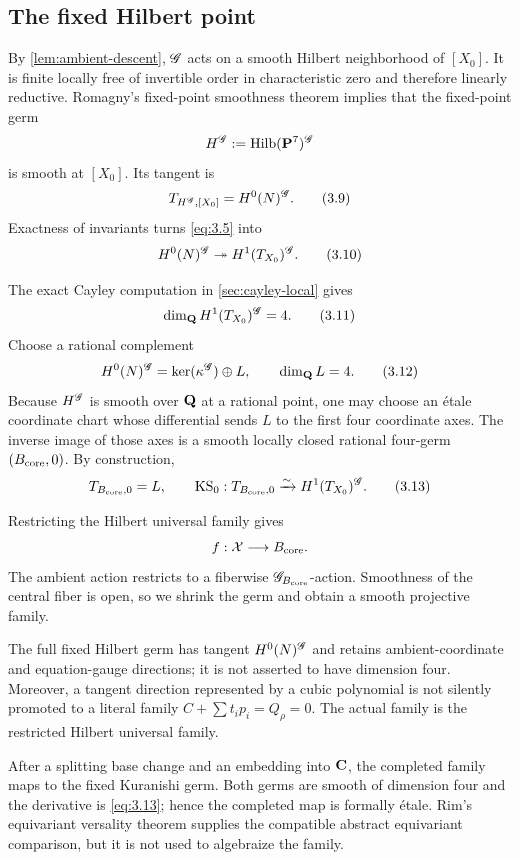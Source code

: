 \subsection{The fixed Hilbert point}

By \cref{lem:ambient-descent}, \(\mathscr G\) acts on a smooth Hilbert
neighborhood of \([X_0]\).  It is finite locally free of invertible order in
characteristic zero and therefore linearly reductive.  Romagny's fixed-point
smoothness theorem \cite[Theorems 1.2.1(2) and 4.3.6]{Romagny2022} implies
that the fixed-point germ
\[
 H^{\mathscr G}:=\operatorname{Hilb}(\mathbf P^7)^{\mathscr G}
\]
is smooth at \([X_0]\).  Its tangent is
\[
 T_{H^{\mathscr G},[X_0]}=H^0(N)^{\mathscr G}.         \tag{3.9}
\]
Exactness of invariants turns \cref{eq:3.5} into
\[
 H^0(N)^{\mathscr G}\twoheadrightarrow
 H^1(T_{X_0})^{\mathscr G}.                          \tag{3.10}
\]

The exact Cayley computation in \cref{sec:cayley-local} gives
\[
 \dim_\mathbf Q H^1(T_{X_0})^{\mathscr G}=4.                \tag{3.11}
\]
Choose a rational complement
\[
 H^0(N)^{\mathscr G}=\ker(\kappa^{\mathscr G})\oplus L,
 \qquad \dim_\mathbf Q L=4.                               \tag{3.12}
\]
Because \(H^{\mathscr G}\) is smooth over \(\mathbf Q\) at a rational point, one
may choose an \'etale coordinate chart whose differential sends \(L\) to
the first four coordinate axes.  The inverse image of those axes is a
smooth locally closed rational four-germ \((B_{\mathrm{core}},0)\).  By construction,
\[
 T_{B_{\mathrm{core}},0}=L,\qquad
 \operatorname{KS}_0:T_{B_{\mathrm{core}},0}\xrightarrow{\sim}
 H^1(T_{X_0})^{\mathscr G}.                          \tag{3.13}
\label{eq:3.13}
\]

Restricting the Hilbert universal family gives
\[
 f:\mathcal X\longrightarrow B_{\mathrm{core}}.
\]
The ambient action restricts to a fiberwise
\(\mathscr G_{B_{\mathrm{core}}}\)-action.  Smoothness of the central fiber is open, so
we shrink the germ and obtain a smooth projective family.

\begin{remark}
The full fixed Hilbert germ has tangent \(H^0(N)^{\mathscr G}\) and retains
ambient-coordinate and equation-gauge directions; it is not asserted to
have dimension four.  Moreover, a tangent direction represented by a cubic
polynomial is not silently promoted to a literal family
\(C+\sum t_ip_i=Q_\rho=0\).  The actual family is the restricted Hilbert
universal family.
\end{remark}

After a splitting base change and an embedding into \(\mathbf C\), the completed
family maps to the fixed Kuranishi germ.  Both germs are smooth of dimension
four and the derivative is \cref{eq:3.13}; hence the completed map is
formally \'etale.  Rim's equivariant versality theorem
\cite[p. 225]{Rim1980} supplies the compatible abstract equivariant
comparison, but it is not used to algebraize the family.
